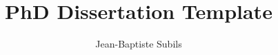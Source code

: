 \documentclass[12pt,frontmatter,copyright,dissertation]{usfmanus}
\title{PhD Dissertation Template} %
\author{Jean-Baptiste Subils} %
\begin{document}


\nocite{JB_Diss} %

\begin{spacing}{1}


\end{spacing}

\begin{appendices}

\end{appendices}

%
\end{document}

